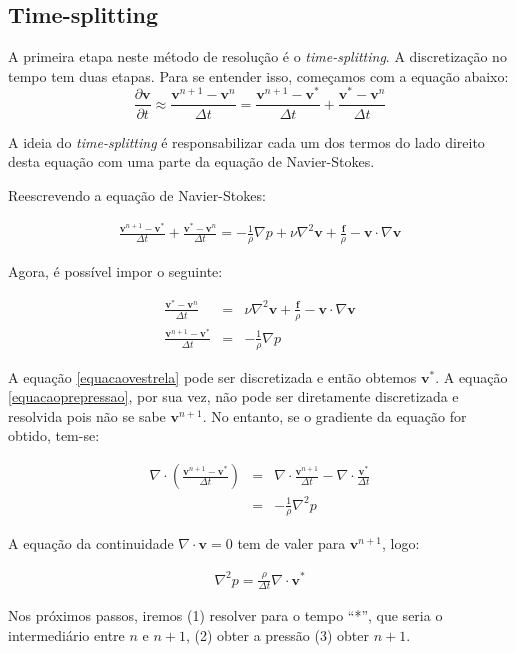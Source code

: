 \documentclass[introducao.tex]{subfiles}
\begin{document}
\subsection{Time-splitting} A primeira etapa neste método de resolução é o \textit{time-splitting}. A discretização no tempo tem duas etapas. Para se entender isso, começamos com a equação abaixo:
\begin{equation}
\frac{\partial \textbf{v}}{\partial t}\approx \frac{\textbf{v}^{n+1}-\textbf{v}^n}{\Delta t}=\frac{\textbf{v}^{n+1}-\textbf{v}^*}{\Delta t}+\frac{\textbf{v}^{*}-\textbf{v}^n}{\Delta t} 
\end{equation}

A ideia do \textit{time-splitting} é responsabilizar cada um dos termos do lado direito desta equação com uma parte da equação de Navier-Stokes.

Reescrevendo a equação de Navier-Stokes:

\begin{eqnarray*}
\frac{\textbf{v}^{n+1}-\textbf{v}^*}{\Delta t}+\frac{\textbf{v}^{*}-\textbf{v}^n}{\Delta t}=-\frac{1}{\rho}\nabla p + \nu\nabla ^2 \textbf{v} + \frac{\textbf{f}}{\rho} - \textbf{v}\cdot \nabla \textbf{v}
\end{eqnarray*}

Agora, é possível impor o seguinte:

\begin{eqnarray}
\frac{\textbf{v}^{*}-\textbf{v}^n}{\Delta t}&=& \nu\nabla ^2 \textbf{v} + \frac{\textbf{f}}{\rho} - \textbf{v}\cdot \nabla \textbf{v}\label{equacaovestrela}\\
\frac{\textbf{v}^{n+1}-\textbf{v}^*}{\Delta t}&=&-\frac{1}{\rho}\nabla p\label{equacaoprepressao}
\end{eqnarray}

A equação \ref{equacaovestrela} pode ser discretizada e então obtemos $\textbf{v}^*$. A equação \ref{equacaoprepressao}, por sua vez, não pode ser diretamente discretizada e resolvida pois não se sabe $\textbf{v}^{n+1}$. No entanto, se o gradiente da equação for obtido, tem-se:

\begin{eqnarray*}
\nabla\cdot \left(\frac{\textbf{v}^{n+1}-\textbf{v}^*}{\Delta t}\right)&=&\nabla\cdot\frac{\textbf{v}^{n+1}}{\Delta t}-\nabla\cdot \frac{\textbf{v}^*}{\Delta t}\\
&=&-\frac{1}{\rho}\nabla^2 p
\end{eqnarray*}

A equação da continuidade $\nabla\cdot \textbf{v}=0$ tem de valer para $\textbf{v}^{n+1}$, logo:

\begin{eqnarray}
\nabla^2 p = \frac{\rho}{\Delta t}\nabla\cdot\textbf{v}^*\label{eqpressao}
\end{eqnarray}

Nos próximos passos, iremos (1) resolver para o tempo ``*'', que seria o intermediário entre $n$ e $n+1$, (2) obter a pressão (3) obter $n+1$.
\end{document}

